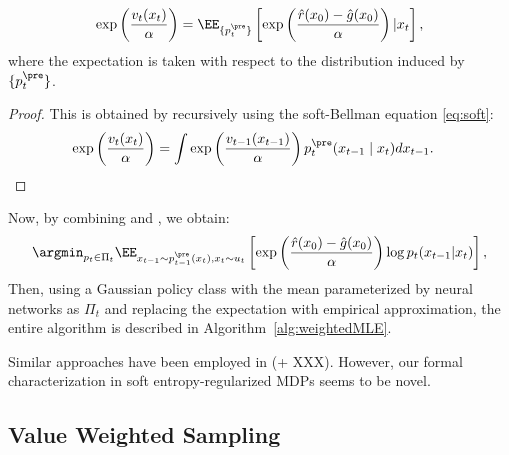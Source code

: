 \begin{lemma}\label{lem:characterization}
    \begin{align*}
   \exp\left(\frac{v_t(x_t)}{\alpha} \right) = \EE_{ \{p^{\pre}_t\} }\left[\exp\left(\frac{\hat r(x_0)-\hat g(x_0)}{\alpha} \right )|x_t \right ], 
\end{align*}
where the expectation is taken with respect to the distribution induced by $ \{p^{\pre}_t\}$. 
\end{lemma}
\begin{proof}
This is obtained by recursively using the soft-Bellman equation  \eqref{eq:soft}: 
\begin{align}
 \exp\left (\frac{ v_{t}(x_{t})}{\alpha}\right )& = \int \exp\left (\frac{ v_{t-1}(x_{t-1})}{\alpha}\right)p^{\pre}_{t}(x_{t-1} \mid x_{t}) d x_{t-1}.  
\end{align}
\end{proof}


Now, by combining  and , we obtain:
    \begin{align*}
 \argmin_{p_t \in \Pi_t} \EE_{x_{t-1}\sim p^{\pre}_{t-1}(x_{t}),x_t\sim u_t }\left[\exp\left(\frac{\hat r(x_0)-\hat g(x_0)}{\alpha}\right) \log p_t(x_{t-1}|x_t) \right ], 
\end{align*}
Then, using a Gaussian policy class with the mean parameterized by neural networks as $\Pi_t$ and replacing the expectation with empirical approximation, the entire algorithm is described in Algorithm~\ref{alg:weightedMLE}.

\begin{remark}
Similar approaches have been employed in \citet{fan2023dpok} (+ XXX). However, our formal characterization in soft entropy-regularized MDPs seems to be novel.
\end{remark}






\subsection{Value Weighted Sampling}

